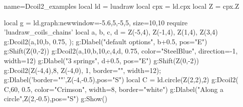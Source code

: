 \begin{luadraw}{name=Dcoil2_examples}
local ld = luadraw
local cpx = ld.cpx
local Z = cpx.Z

local g = ld.graph:new{window={-5.6,5,-5,5}, size={10,10}}
require 'luadraw_coils_chains'
local a, b, c, d = Z(-5,4), Z(-1,4), Z(1,4), Z(3,4)
g:Dcoil2({a,10,b}, 0.75, {}); g:Dlabel("default options", b+0.5, {pos="E"})
g:Shift(Z(0,-2))
g:Dcoil2({a,10,b,10,c,4,d}, 0.75, {color="SteelBlue", direction=-1, width=12})
g:Dlabel("3 springs", d+0.5, {pos="E"})
g:Shift(Z(0,-2))
g:Dcoil2({Z(-4,4),8, Z(-4,0)}, 1, {border="", width=12}); g:Dlabel('border=""',Z(-4,-0.5),{pos="S"})
local C = ld.circle(Z(2,2),2)
g:Dcoil2( {C,60}, 0.5, {color="Crimson", width=8, border="white"})
g:Dlabel("Along a circle",Z(2,-0.5),{pos="S"})
g:Show()
\end{luadraw}
